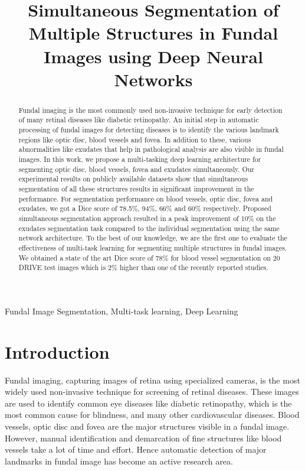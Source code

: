 \documentclass{article}
\title{Simultaneous Segmentation of Multiple Structures in Fundal Images using Deep Neural Networks}
\begin{document}
%
\maketitle
%
\begin{abstract}
Fundal imaging is the most commonly used non-invasive technique for early detection of many retinal diseases like diabetic retinopathy.
An initial step in automatic processing of fundal images for detecting diseases is to identify the various landmark regions like optic disc, blood vessels and fovea.
In addition to these, various abnormalities like exudates that help in pathological analysis are also visible in fundal images.
In this work, we propose a multi-tasking deep learning architecture for segmenting optic disc, blood vessels, fovea and exudates simultaneously.
Our experimental results on publicly available datasets show that simultaneous segmentation of all these structures results in significant improvement in the performance.
For segmentation performance on blood vessels, optic disc, fovea and exudates, we got a Dice score of 78.5\%, 94\%, 66\% and 60\% respectively.
Proposed simultaneous segmentation approach resulted in a peak  improvement of 10\%  on the exudates segmentation task compared to the individual segmentation using the same network architecture.
To the best of our knowledge, we  are the first one to evaluate the effectiveness of  multi-task learning for segmenting multiple structures in fundal images.
We obtained a state of the art Dice score of 78\% for blood vessel segmentation on 20 DRIVE test images which is 2\% higher than one of the recently reported studies.
\end{abstract}
%
\begin{keywords}
Fundal Image Segmentation, Multi-task learning, Deep Learning
\end{keywords}
%

\section{Introduction}
Fundal imaging, capturing images of retina using specialized cameras, is the most widely used non-invasive technique for screening of retinal diseases.
These images are used to identify common eye diseases like diabetic retinopathy, which is the most common cause for blindness, and many other cardiovascular diseases.
Blood vessels, optic disc and fovea are the major structures visible in a fundal image.
However, manual identification and demarcation of fine structures like blood vessels take a lot of time and effort.
Hence automatic detection of major landmarks in fundal image has become an active research area.
\end{document}
